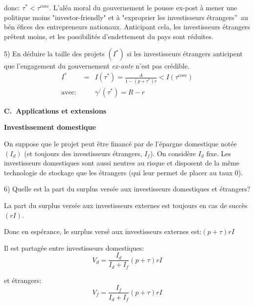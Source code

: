 \documentclass[a4paper]{article}
\begin{document}
donc: $\tau ^{\ast }<\tau ^{com}$. L'al\'{e}a moral du gouvernement le
pousse ex-post \`{a} mener une politique moins "investor-friendly" et \`{a}
"exproprier les investisseurs \'{e}trangers\textquotedblright\ au b\'{e}n%
\'{e}fices des entrepreneurs nationaux. Anticipant cela, les investisseurs 
\'{e}trangers pr\^{e}tent moins, et les possibilit\'{e}s d'endettement du
pays sont r\'{e}duites.

\bigskip

5) En d\'{e}duire la taille des projets $(I^{\ast })$ si les investisseurs 
\'{e}trangers anticipent que l'engagement du gouvernement \textit{ex-ante}
n'est pas cr\'{e}dible.%
\begin{eqnarray*}
I^{\ast } &=&I(\tau ^{\ast })=\frac{A}{1-(p+\tau ^{\ast })r}<I(\tau ^{com})
\\
\text{avec}\text{: } &&\gamma ^{/}(\tau ^{\ast })=R-r
\end{eqnarray*}

\bigskip

\textbf{C.\ Applications et extensions}

\bigskip

\textbf{Investissement domestique}

\bigskip

On suppose que le projet peut \^{e}tre financ\'{e} par de l'\'{e}pargne
domestique not\'{e}e $\left( I_{d}\right) $ (et toujours des investisseurs 
\'{e}trangers, $I_{f}$). On consid\`{e}re $I_{d}$ fixe. Les investisseurs
domestiques sont aussi neutres au risque et disposent de la m\^{e}me
technologie de stockage que les \'{e}trangers (qui leur permet de placer au
taux $0$).

\bigskip

6) Quelle est la part du surplus vers\'{e}e aux investisseurs domestiques et 
\'{e}trangers?

\bigskip

La part du surplus vers\'{e}e aux investisseurs externes est toujours en cas
de succ\`{e}s $\left( rI\right) $.

Donc en esp\'{e}rance, le surplus vers\'{e} aux investisseurs externes est:$%
(p+\tau )rI$

Il est partag\'{e}e entre investisseurs domestiques:%
\begin{equation*}
V_{d}=\frac{I_{d}}{I_{d}+I_{f}}(p+\tau )rI
\end{equation*}

et \'{e}trangers:%
\begin{equation*}
V_{f}=\frac{I_{f}}{I_{d}+I_{f}}(p+\tau )rI
\end{equation*}
\end{document}
